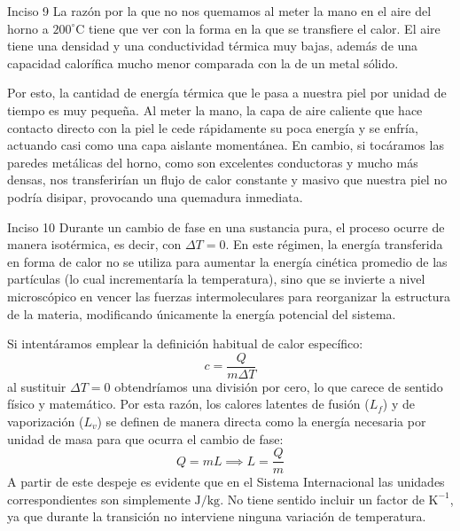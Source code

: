 \documentclass[11pt,letterpaper]{article}
\begin{document}
\begin{inciso}{Inciso 9}
La razón por la que no nos quemamos al meter la mano en el aire del horno a $200^{\circ}\text{C}$ tiene que ver con la forma en la que se transfiere el calor. El aire tiene una densidad y una conductividad térmica muy bajas, además de una capacidad calorífica mucho menor comparada con la de un metal sólido. 

Por esto, la cantidad de energía térmica que le pasa a nuestra piel por unidad de tiempo es muy pequeña. Al meter la mano, la capa de aire caliente que hace contacto directo con la piel le cede rápidamente su poca energía y se enfría, actuando casi como una capa aislante momentánea. En cambio, si tocáramos las paredes metálicas del horno, como son excelentes conductoras y mucho más densas, nos transferirían un flujo de calor constante y masivo que nuestra piel no podría disipar, provocando una quemadura inmediata.
\end{inciso}
\begin{inciso}{Inciso 10}
Durante un cambio de fase en una sustancia pura, el proceso ocurre de manera isotérmica, es decir, con $\Delta T = 0$. En este régimen, la energía transferida en forma de calor no se utiliza para aumentar la energía cinética promedio de las partículas (lo cual incrementaría la temperatura), sino que se invierte a nivel microscópico en vencer las fuerzas intermoleculares para reorganizar la estructura de la materia, modificando únicamente la energía potencial del sistema.

Si intentáramos emplear la definición habitual de calor específico:
\[
c = \frac{Q}{m \Delta T}
\]
al sustituir $\Delta T = 0$ obtendríamos una división por cero, lo que carece de sentido físico y matemático. Por esta razón, los calores latentes de fusión ($L_f$) y de vaporización ($L_v$) se definen de manera directa como la energía necesaria por unidad de masa para que ocurra el cambio de fase:
\[
Q = m L \implies L = \frac{Q}{m}
\]
A partir de este despeje es evidente que en el Sistema Internacional las unidades correspondientes son simplemente $\text{J/kg}$. No tiene sentido incluir un factor de $\text{K}^{-1}$, ya que durante la transición no interviene ninguna variación de temperatura.
\end{inciso}
\end{document}
